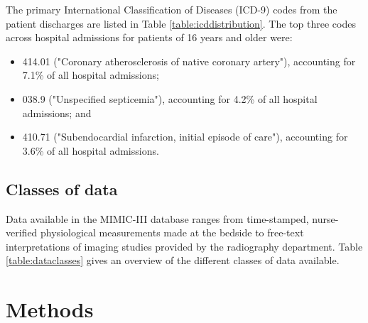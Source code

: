 \documentclass[english]{article}
\begin{document}
The primary International Classification of Diseases (ICD-9) codes from the patient discharges are listed in Table \ref{table:icddistribution}. The top three codes across hospital admissions for patients of 16 years and older were: 
\begin{itemize}
\item 414.01 ("Coronary atherosclerosis of native coronary artery"), accounting for 7.1\% of all hospital admissions; 
\item 038.9 ("Unspecified septicemia"), accounting for 4.2\% of all hospital admissions; and
\item 410.71 ("Subendocardial infarction, initial episode of care"), accounting for 3.6\% of all hospital admissions. 
\end{itemize}




\subsection*{Classes of data}

Data available in the MIMIC-III database ranges from time-stamped, nurse-verified physiological measurements made at the bedside to free-text interpretations of imaging studies provided by the radiography department. Table \ref{table:dataclasses} gives an overview of the different classes of data available. 

\section*{Methods}

\end{document}
